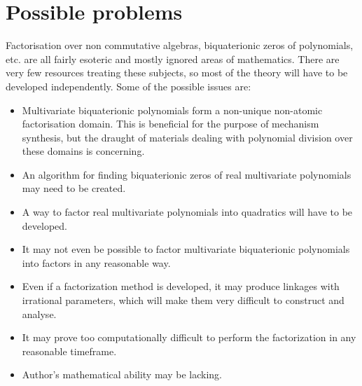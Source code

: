 \section{Possible problems}
Factorisation over non commutative algebras, biquaterionic zeros of polynomials, etc. are all fairly esoteric and mostly ignored areas of mathematics. There are very few resources treating these subjects, so most of the theory will have to be developed independently. Some of the possible issues are:
\begin{itemize}
    \item Multivariate biquaterionic polynomials form a non-unique non-atomic factorisation domain. This is beneficial for the purpose of mechanism synthesis, but the draught of materials dealing with polynomial division over these domains is concerning.
    \item An algorithm for finding biquaterionic zeros of real multivariate polynomials may need to be created.
    \item A way to factor real multivariate polynomials into quadratics will have to be developed.
    \item It may not even be possible to factor multivariate  biquaterionic polynomials into factors in any reasonable way.
    \item Even if a factorization method is developed, it may produce linkages with irrational parameters, which will make them very difficult to construct and analyse.
    \item It may prove too computationally difficult to perform the factorization in any reasonable timeframe.
    \item Author's mathematical ability may be lacking.
\end{itemize}

